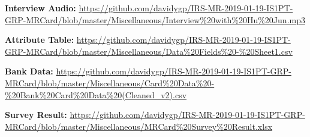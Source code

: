 	\textbf{Interview Audio:} \url{https://github.com/davidygp/IRS-MR-2019-01-19-IS1PT-GRP-MRCard/blob/master/Miscellaneous/Interview%20with%20Hu%20Jun.mp3}

	\textbf{Attribute Table:} \url{https://github.com/davidygp/IRS-MR-2019-01-19-IS1PT-GRP-MRCard/blob/master/Miscellaneous/Data%20Fields%20-%20Sheet1.csv}

	\textbf{Bank Data:} \url{https://github.com/davidygp/IRS-MR-2019-01-19-IS1PT-GRP-MRCard/blob/master/Miscellaneous/Card%20Data%20-%20Bank%20Card%20Data%20(Cleaned_v2).csv}

	\textbf{Survey Result:} \url{https://github.com/davidygp/IRS-MR-2019-01-19-IS1PT-GRP-MRCard/blob/master/Miscellaneous/MRCard%20Survey%20Result.xlsx}




